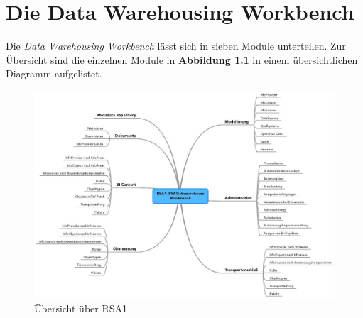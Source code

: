 \chapter{Die Data Warehousing Workbench}
\label{Abschnitt:Motivation}

Die \textit{Data Warehousing Workbench} lässt sich in sieben Module unterteilen. Zur Übersicht sind die einzelnen Module in \textbf{Abbildung \ref{pic:RSA1}} in einem übersichtlichen Diagramm aufgelistet.\\

\begin{figure}[H]
    \centering
    \includegraphics[width=1\textwidth]{files/RSA1Mindmap}
    \caption{Übersicht über RSA1}
    \label{pic:RSA1}
\end{figure}

